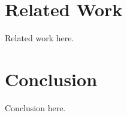 \documentclass[manuscript,review,anonymous]{acmart}
\begin{document}
\section{Related Work}
\label{sec:related}
Related work here.

\section{Conclusion}
\label{sec:conclusion}
Conclusion here.




\end{document}
